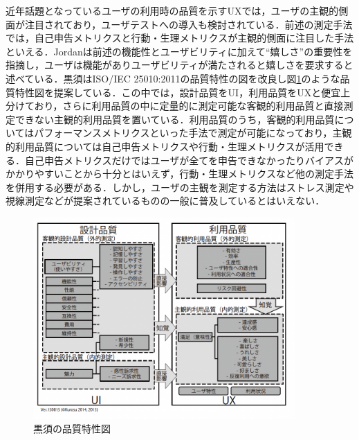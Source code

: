 近年話題となっているユーザの利用時の品質を示すUXでは，ユーザの主観的側面が注目されており，ユーザテストへの導入も検討されている．前述の測定手法では，自己申告メトリクスと行動・生理メトリクスが主観的側面に注目した手法といえる．Jordanは前述の機能性とユーザビリティに加えて``嬉しさ''の重要性を指摘し，ユーザは機能がありユーザビリティが満たされると嬉しさを要求すると述べている\cite{jordan2000designing}．黒須はISO/IEC 25010:2011の品質特性の図を改良し図\ref{fig:kurosu2015}のような品質特性図を提案している\cite{kurosu2015}．この中では，設計品質をUI，利用品質をUXと便宜上分けており，さらに利用品質の中に定量的に測定可能な客観的利用品質と直接測定できない主観的利用品質を置いている．利用品質のうち，客観的利用品質についてはパフォーマンスメトリクスといった手法で測定が可能になっており，主観的利用品質については自己申告メトリクスや行動・生理メトリクスが活用できる．自己申告メトリクスだけではユーザが全てを申告できなかったりバイアスがかかりやすいことから十分とはいえず，行動・生理メトリクスなど他の測定手法を併用する必要がある．しかし，ユーザの主観を測定する方法はストレス測定や視線測定などが提案されているものの一般に普及しているとはいえない．

\begin{figure}[htbp]
  \begin{minipage}{\hsize}
    \begin{center}
       \includegraphics[width=100mm]{img/kurosu2015.png}
    \end{center}
    \caption{黒須の品質特性図\cite{kurosu}}
    \label{fig:kurosu2015}
  \end{minipage}
\end{figure}

